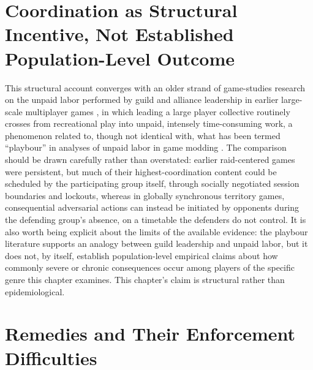 \section{Coordination as Structural Incentive, Not Established Population-Level Outcome}

This structural account converges with an older strand of game-studies research on the unpaid labor performed by guild and alliance leadership in earlier large-scale multiplayer games \cite{koster2005}, in which leading a large player collective routinely crosses from recreational play into unpaid, intensely time-consuming work, a phenomenon related to, though not identical with, what has been termed ``playbour'' in analyses of unpaid labor in game modding \cite{kucklich2005}. The comparison should be drawn carefully rather than overstated: earlier raid-centered games were persistent, but much of their highest-coordination content could be scheduled by the participating group itself, through socially negotiated session boundaries and lockouts, whereas in globally synchronous territory games, consequential adversarial actions can instead be initiated by opponents during the defending group's absence, on a timetable the defenders do not control. It is also worth being explicit about the limits of the available evidence: the playbour literature supports an analogy between guild leadership and unpaid labor, but it does not, by itself, establish population-level empirical claims about how commonly severe or chronic consequences occur among players of the specific genre this chapter examines. This chapter's claim is structural rather than epidemiological.

\section{Remedies and Their Enforcement Difficulties}

